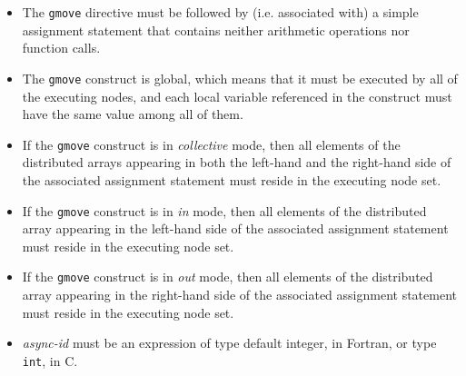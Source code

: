 \begin{itemize}
 \item The {\tt gmove} directive must be followed by (i.e. associated
       with) a simple assignment statement that contains neither
       arithmetic operations nor function calls.
 \item The {\tt gmove} construct is global, which means that it must be
       executed by all of the executing nodes, and each local variable
       referenced in the construct must have the same value among all of
       them.
 \item If the {\tt gmove} construct is in {\it collective} mode, then
       all elements of the distributed arrays appearing in both the
       left-hand and the right-hand side of the associated assignment
       statement must reside in the executing node set.
 \item If the {\tt gmove} construct is in {\it in} mode, then
       all elements of the distributed array appearing in the left-hand
       side of the associated assignment statement must reside in the
       executing node set.
 \item If the {\tt gmove} construct is in {\it out} mode, then
       all elements of the distributed array appearing in the right-hand
       side of the associated assignment statement must reside in the
       executing node set.
 \item {\it async-id} must be an expression of type default integer, in
       Fortran, or type {\tt int}, in C.
\end{itemize}

